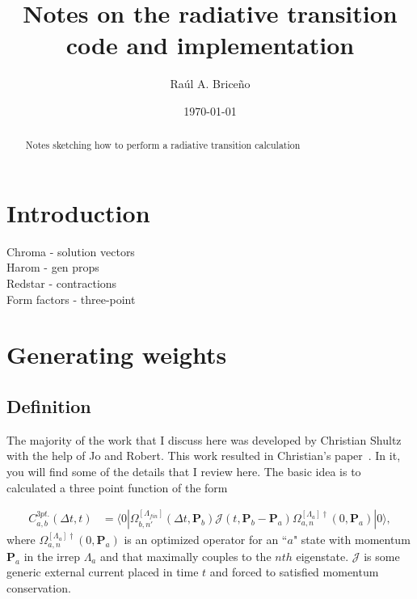 \documentclass[prd,showpacs,showkeys,preprintnumbers,floatfix,
nofootinbib,superscriptaddress]{revtex4}
\begin{document}
\title{Notes on the radiative transition code and implementation
}

\author{Ra\'ul A. Brice\~no}
%
%




\date{\today}
%
\begin{abstract}
Notes sketching how to perform a radiative transition calculation  
\end{abstract}
%
\maketitle






\section{Introduction}
 
\indent
Chroma - solution vectors\\
\indent
Harom  - gen props\\
\indent
Redstar - contractions\\
\indent
Form factors - three-point\\

\section{Generating weights}
\subsection{Definition}
 
The majority of the work that I discuss here was developed by Christian Shultz with the help of Jo and Robert. This work resulted in Christian's paper~\cite{Shultz:2015pfa}. In it, you will find some of the details that I review here. The basic idea is to calculated a three point function of the form 

\begin{align}
C^{3pt.}_{a,b}(\Delta t,t)&=
\langle
0|
\Omega^{[\Lambda_{fin}]}_{b,n'}(\Delta t, \textbf{P}_{b})
{\mathcal{J}}(t,\textbf{P}_{b}-\textbf{P}_{a})
\Omega^{[\Lambda_{a}]\dag}_{a,n}(0, \textbf{P}_{a})
|0\rangle,
\label{eq:Cpipi_to_pi}
\end{align}
where $\Omega^{[\Lambda_{a}]\dag}_{a,n}(0, \textbf{P}_{a})$ is an optimized operator for an ``$a$" state with momentum $\textbf{P}_{a}$ in the irrep $\Lambda_{a}$ and that maximally couples to the $nth$ eigenstate. ${\mathcal{J}}$ is some generic external current placed in time $t$ and forced to satisfied momentum conservation. 
\end{document}
